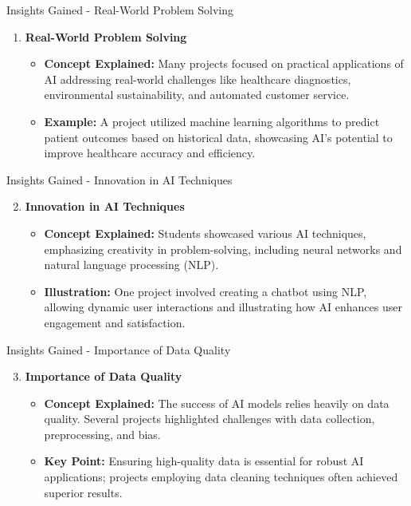 \documentclass[aspectratio=169]{beamer}
\begin{document}
\begin{frame}[fragile]{Insights Gained - Real-World Problem Solving}
    \begin{enumerate}
        \item \textbf{Real-World Problem Solving}
        \begin{itemize}
            \item \textbf{Concept Explained:} Many projects focused on practical applications of AI addressing real-world challenges like healthcare diagnostics, environmental sustainability, and automated customer service.
            \item \textbf{Example:} A project utilized machine learning algorithms to predict patient outcomes based on historical data, showcasing AI’s potential to improve healthcare accuracy and efficiency.
        \end{itemize}
    \end{enumerate}
\end{frame}

\begin{frame}[fragile]{Insights Gained - Innovation in AI Techniques}
    \begin{enumerate}
        \setcounter{enumi}{1} %
        \item \textbf{Innovation in AI Techniques}
        \begin{itemize}
            \item \textbf{Concept Explained:} Students showcased various AI techniques, emphasizing creativity in problem-solving, including neural networks and natural language processing (NLP).
            \item \textbf{Illustration:} One project involved creating a chatbot using NLP, allowing dynamic user interactions and illustrating how AI enhances user engagement and satisfaction.
        \end{itemize}
    \end{enumerate}
\end{frame}

\begin{frame}[fragile]{Insights Gained - Importance of Data Quality}
    \begin{enumerate}
        \setcounter{enumi}{2} %
        \item \textbf{Importance of Data Quality}
        \begin{itemize}
            \item \textbf{Concept Explained:} The success of AI models relies heavily on data quality. Several projects highlighted challenges with data collection, preprocessing, and bias.
            \item \textbf{Key Point:} Ensuring high-quality data is essential for robust AI applications; projects employing data cleaning techniques often achieved superior results.
        \end{itemize}
    \end{enumerate}
\end{frame}
\end{document}

